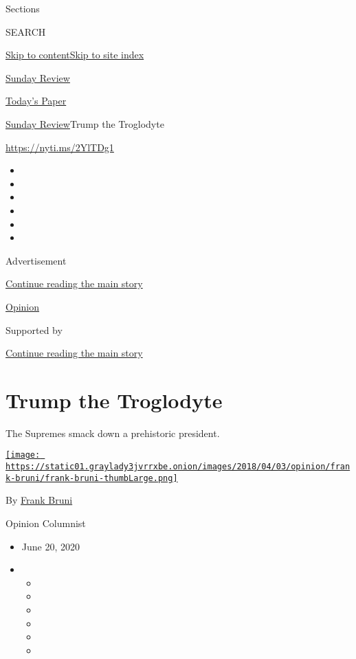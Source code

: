 Sections

SEARCH

\protect\hyperlink{site-content}{Skip to
content}\protect\hyperlink{site-index}{Skip to site index}

\href{https://www.nytimes3xbfgragh.onion/section/opinion/sunday}{Sunday
Review}

\href{https://myaccount.nytimes3xbfgragh.onion/auth/login?response_type=cookie\&client_id=vi}{}

\href{https://www.nytimes3xbfgragh.onion/section/todayspaper}{Today's
Paper}

\href{/section/opinion/sunday}{Sunday Review}\textbar{}Trump the
Troglodyte

\url{https://nyti.ms/2YlTDg1}

\begin{itemize}
\item
\item
\item
\item
\item
\item
\end{itemize}

Advertisement

\protect\hyperlink{after-top}{Continue reading the main story}

\href{/section/opinion}{Opinion}

Supported by

\protect\hyperlink{after-sponsor}{Continue reading the main story}

\hypertarget{trump-the-troglodyte}{%
\section{Trump the Troglodyte}\label{trump-the-troglodyte}}

The Supremes smack down a prehistoric president.

\href{https://www.nytimes3xbfgragh.onion/by/frank-bruni}{\texttt{[image: https://static01.graylady3jvrrxbe.onion/images/2018/04/03/opinion/frank-bruni/frank-bruni-thumbLarge.png]}}

By \href{https://www.nytimes3xbfgragh.onion/by/frank-bruni}{Frank Bruni}

Opinion Columnist

\begin{itemize}
\item
  June 20, 2020
\item
  \begin{itemize}
  \item
  \item
  \item
  \item
  \item
  \item
  \end{itemize}
\end{itemize}

